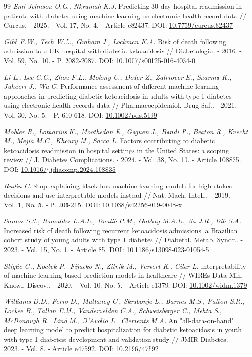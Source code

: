 \documentclass{crm-article}
\begin{document}
\begin{thebibliography}{99}
 \textit{Emi-Johnson O.G., Nkrumah K.J.} Predicting 30-day hospital readmission in patients with diabetes using machine learning on electronic health record data // Cureus. - 2025. - Vol. 17, No. 4. - Article e82437. DOI: \url{10.7759/cureus.82437}

 \textit{Gibb F.W., Teoh W.L., Graham J., Lockman K.A.} Risk of death following admission to a UK hospital with diabetic ketoacidosis // Diabetologia. - 2016. - Vol. 59, No. 10. - P. 2082-2087. DOI: \url{10.1007/s00125-016-4034-0}

 \textit{Li L., Lee C.C., Zhou F.L., Molony C., Doder Z., Zalmover E., Sharma K., Juhaeri J., Wu C.} Performance assessment of different machine learning approaches in predicting diabetic ketoacidosis in adults with type 1 diabetes using electronic health records data // Pharmacoepidemiol. Drug Saf.. - 2021. - Vol. 30, No. 5. - P. 610-618. DOI: \url{10.1002/pds.5199}

 \textit{Mohler R., Lotharius K., Moothedan E., Goguen J., Bandi R., Beaton R., Knecht M., Mejia M.C., Khoury M., Sacca L.} Factors contributing to diabetic ketoacidosis readmission in hospital settings in the United States: a scoping review // J. Diabetes Complications. - 2024. - Vol. 38, No. 10. - Article 108835. DOI: \url{10.1016/j.jdiacomp.2024.108835}

 \textit{Rudin C.} Stop explaining black box machine learning models for high stakes decisions and use interpretable models instead // Nat. Mach. Intell.. - 2019. - Vol. 1, No. 5. - P. 206-215. DOI: \url{10.1038/s42256-019-0048-x}

 \textit{Santos S.S., Ramaldes L.A.L., Dualib P.M., Gabbay M.A.L., Sa J.R., Dib S.A.} Increased risk of death following recurrent ketoacidosis admissions: a Brazilian cohort study of young adults with type 1 diabetes // Diabetol. Metab. Syndr.. - 2023. - Vol. 15, No. 1. - Article 85. DOI: \url{10.1186/s13098-023-01054-5}

 \textit{Stiglic G., Kocbek P., Fijacko N., Zitnik M., Verbert K., Cilar L.} Interpretability of machine learning-based prediction models in healthcare // WIREs Data Min. Knowl. Discov.. - 2020. - Vol. 10, No. 5. - Article e1379. DOI: \url{10.1002/widm.1379}

 \textit{Williams D.D., Ferro D., Mullaney C., Skrabonja L., Barnes M.S., Patton S.R., Lockee B., Tallon E.M., Vandervelden C.A., Schweisberger C., Mehta S., McDonough R., Lind M., D'Avolio L., Clements M.A.} An "all-data-on-hand" deep learning model to predict hospitalization for diabetic ketoacidosis in youth with type 1 diabetes: development and validation study // JMIR Diabetes. - 2023. - Vol. 8. - Article e47592. DOI: \url{10.2196/47592}
\end{thebibliography}
\end{document}
